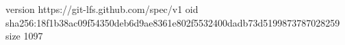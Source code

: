 version https://git-lfs.github.com/spec/v1
oid sha256:18f1b38ac09f54350deb6d9ae8361e802f5532400dadb73d5199873787028259
size 1097
